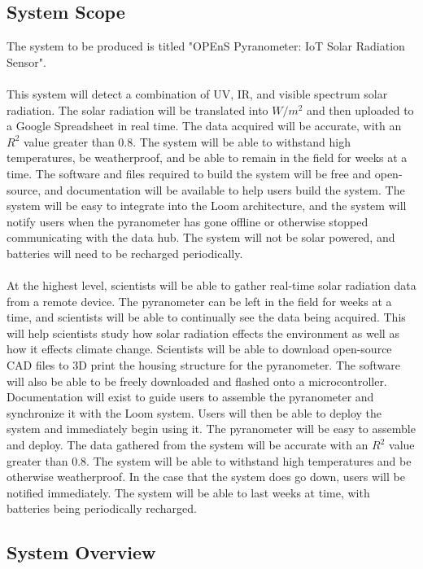 \documentclass[10pt,draftclsnofoot,onecolumn,letterpaper]{article}
\begin{document}
\subsection{System Scope}
The system to be produced is titled "OPEnS Pyranometer: IoT Solar Radiation Sensor".\\\\This system will detect a combination of UV, IR, and visible spectrum solar radiation. The solar radiation will be translated into $W/m^2$ and then uploaded to a Google Spreadsheet in real time. The data acquired will be accurate, with an $R^2$ value greater than 0.8. The system will be able to withstand high temperatures, be weatherproof, and be able to remain in the field for weeks at a time. The software and files required to build the system will be free and open-source, and documentation will be available to help users build the system. The system will be easy to integrate into the Loom architecture, and the system will notify users when the pyranometer has gone offline or otherwise stopped communicating with the data hub. The system will not be solar powered, and batteries will need to be recharged periodically.\\\\At the highest level, scientists will be able to gather real-time solar radiation data from a remote device. The pyranometer can be left in the field for weeks at a time, and scientists will be able to continually see the data being acquired. This will help scientists study how solar radiation effects the environment as well as how it effects climate change. Scientists will be able to download open-source CAD files to 3D print the housing structure for the pyranometer. The software will also be able to be freely downloaded and flashed onto a microcontroller. Documentation will exist to guide users to assemble the pyranometer and synchronize it with the Loom system. Users will then be able to deploy the system and immediately begin using it. The pyranometer will be easy to assemble and deploy. The data gathered from the system will be accurate with an $R^2$ value greater than 0.8. The system will be able to withstand high temperatures and be otherwise weatherproof. In the case that the system does go down, users will be notified immediately. The system will be able to last weeks at time, with batteries being periodically recharged.

\subsection{System Overview}
\end{document}
